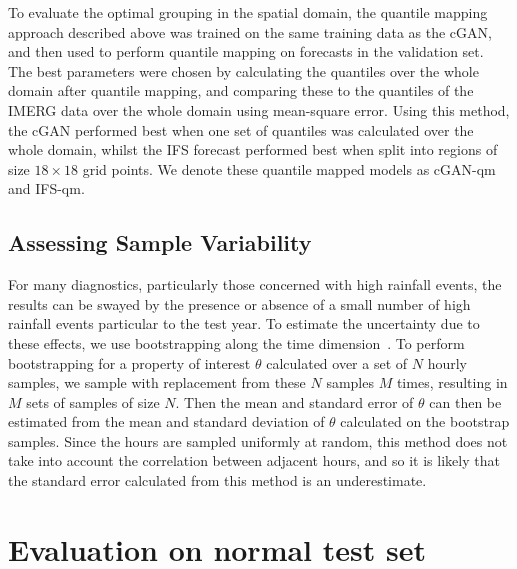 \documentclass{article}
\begin{document}
To evaluate the optimal grouping in the spatial domain, the quantile mapping approach described above was trained on the same training data as the cGAN, and then used to perform quantile mapping on forecasts in the validation set. The best parameters were chosen by calculating the quantiles over the whole domain after quantile mapping, and comparing these to the quantiles of the IMERG data over the whole domain using mean-square error. Using this method, the cGAN performed best when one set of quantiles was calculated over the whole domain, whilst the IFS forecast performed best when split into regions of size $18 \times 18$ grid points. We denote these quantile mapped models as cGAN-qm and IFS-qm.



\subsection{Assessing Sample Variability}
\label{sec:sample_var}


For many diagnostics, particularly those concerned with high rainfall events, the results can be swayed by the presence or absence of a small number of high rainfall events particular to the test year. To estimate the uncertainty due to these effects, we use bootstrapping along the time dimension~\cite{efron_bootstrap_1986}. To perform bootstrapping for a property of interest $\theta$ calculated over a set of $N$ hourly samples, we sample with replacement from these $N$ samples $M$ times, resulting in $M$ sets of samples of size $N$. Then the mean and standard error of $\theta$ can then be estimated from the mean and standard deviation of $\theta$ calculated on the bootstrap samples. Since the hours are sampled uniformly at random, this method does not take into account the correlation between adjacent hours, and so it is likely that the standard error calculated from this method is an underestimate.




\section{Evaluation on normal test set}
\end{document}

